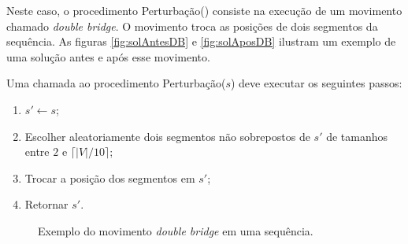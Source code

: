 Neste caso, o procedimento Perturbação() consiste na execução de um movimento chamado \textit{double bridge}. O movimento troca as posições de dois segmentos da sequência. As figuras \ref{fig:solAntesDB} e \ref{fig:solAposDB} ilustram um exemplo de uma solução antes e após esse movimento. 

Uma chamada ao procedimento Perturbação(\(s\)) deve executar os seguintes passos:

\begin{enumerate}
    \item \(s' \gets s\);
    \item Escolher aleatoriamente dois segmentos não sobrepostos de \(s'\) de tamanhos entre \(2\) e \(\lceil |V|/10 \rceil\);
    \item Trocar a posição dos segmentos em \(s'\);
    \item Retornar \(s'\).
\end{enumerate}



\begin{figure}[htpb!]
    \centering
    \qquad


    \caption{Exemplo do movimento \textit{double bridge} em uma sequência.}
    \label{fig:exemploDoubleBridge}
\end{figure}



